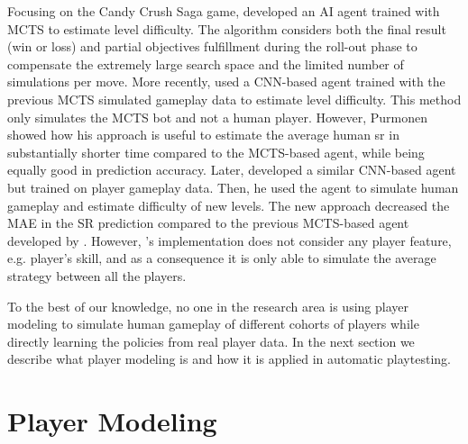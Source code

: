 Focusing on the Candy Crush Saga game, \textcite{poromaa_crushing_2017} developed an AI agent trained with \acf{MCTS} to estimate level difficulty. The algorithm considers both the final result (win or loss) and partial objectives fulfillment during the roll-out phase to compensate the extremely large search space and the limited number of simulations per move. More recently, \textcite{purmonen_predicting_2017} used a \acs{CNN}-based agent trained with the previous \acs{MCTS} simulated gameplay data to estimate level difficulty. This method only simulates the \acs{MCTS} bot and not a human player. However, Purmonen showed how his approach is useful to estimate the average human \acs{sr} in substantially shorter time compared to the \acs{MCTS}-based agent, while being equally good in prediction accuracy. Later, \textcite{eisen_simulating_2017} developed a similar \acs{CNN}-based agent but trained on player gameplay data. Then, he used the agent to simulate human gameplay and estimate difficulty of new levels. The new approach decreased the \acf{MAE} in the SR prediction compared to the previous \acs{MCTS}-based agent developed by \textcite{poromaa_crushing_2017}. However, \citeauthor{eisen_simulating_2017}'s implementation does not consider any player feature, e.g. player's skill, and as a consequence it is only able to simulate the average strategy between all the players.

To the best of our knowledge, no one in the research area is using player modeling to simulate human gameplay of different cohorts of players while directly learning the policies from real player data. In the next section we describe what player modeling is and how it is applied in automatic playtesting.





\section{Player Modeling}

